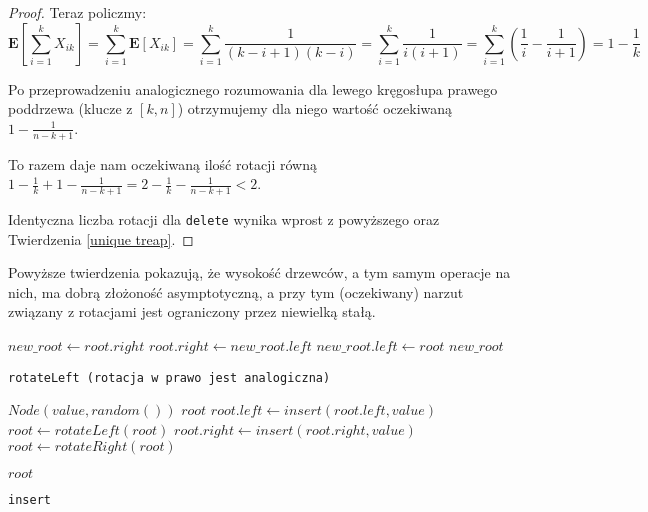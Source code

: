 \begin{proof}
Teraz policzmy:
$$
\mathbf{E}[\sum_{i=1}^{k}X_{ik}]=
\sum_{i=1}^{k}\mathbf{E}[X_{ik}]=
\sum_{i=1}^{k}\frac{1}{(k-i+1)(k-i)}=
\sum_{i=1}^{k}\frac{1}{i(i+1)}=
\sum_{i=1}^{k}(\frac{1}{i}-\frac{1}{i+1})=
1-\frac{1}{k}
$$

Po przeprowadzeniu analogicznego rozumowania dla lewego kręgosłupa prawego poddrzewa (klucze z $[k,n]$) otrzymujemy dla niego wartość oczekiwaną $1 - \frac{1}{n-k+1}$.

To razem daje nam oczekiwaną ilość rotacji równą $1 - \frac{1}{k} + 1 - \frac{1}{n-k+1} = 2 -  \frac{1}{k} - \frac{1}{n-k+1} < 2$.

Identyczna liczba rotacji dla \texttt{delete} wynika wprost z powyższego oraz Twierdzenia \ref{unique treap}.
\end{proof}

Powyższe twierdzenia pokazują, że wysokość drzewców, a tym samym operacje na nich, ma dobrą złożoność asymptotyczną, a przy tym (oczekiwany) narzut związany z rotacjami jest ograniczony przez niewielką stałą.

\newpage

\begin{algorithm}
  \DontPrintSemicolon


  $new\_root \leftarrow root.right$\;
  $root.right \leftarrow new\_root.left$\;
  $new\_root.left \leftarrow root$\;
  \Return $new\_root$\;
  
  \caption{\texttt{rotateLeft (rotacja w prawo jest analogiczna)}}
  \label{treap-rotate-left}
\end{algorithm}

\begin{algorithm}
  \DontPrintSemicolon

  {
    \Return $Node(value, random())$\;
  }
  {
    \Return $root$\;
  }
  {
    $root.left \leftarrow insert(root.left, value)$\;
    {
      $root \leftarrow rotateLeft(root)$\;
    }
  }
  {
    $root.right \leftarrow insert(root.right, value)$\;
    {
      $root \leftarrow rotateRight(root)$\;
    }
  }
  
  \Return $root$\;
  \caption{\texttt{insert}}
  \label{treap-insert}
\end{algorithm}

